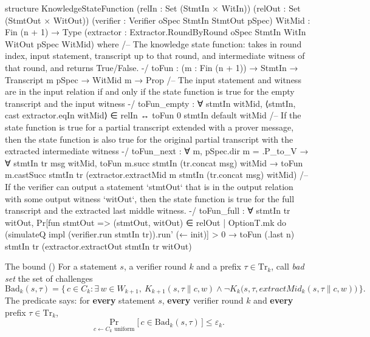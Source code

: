 \begin{leancode}
structure KnowledgeStateFunction
    (relIn : Set (StmtIn × WitIn)) (relOut : Set (StmtOut × WitOut))
    (verifier : Verifier oSpec StmtIn StmtOut pSpec)
    {WitMid : Fin (n + 1) → Type}
    (extractor : Extractor.RoundByRound oSpec StmtIn WitIn WitOut pSpec WitMid)
    where
  /-- The knowledge state function: takes in round index, input statement, transcript up to that
      round, and intermediate witness of that round, and returns True/False. -/
  toFun : (m : Fin (n + 1)) → StmtIn → Transcript m pSpec → WitMid m → Prop
  /-- The input statement and witness are in the input relation if and only if the state function is
      true for the empty transcript and the input witness -/
  toFun_empty : ∀ stmtIn witMid,
    ⟨stmtIn, cast extractor.eqIn witMid⟩ ∈ relIn ↔ toFun 0 stmtIn default witMid
  /-- If the state function is true for a partial transcript extended with a prover message, then
    the state function is also true for the original partial transcript with the extracted
    intermediate witness -/
  toFun_next : ∀ m, pSpec.dir m = .P_to_V →
    ∀ stmtIn tr msg witMid, toFun m.succ stmtIn (tr.concat msg) witMid →
      toFun m.castSucc stmtIn tr (extractor.extractMid m stmtIn (tr.concat msg) witMid)
  /-- If the verifier can output a statement `stmtOut` that is in the output relation with some
    output witness `witOut`, then the state function is true for the full transcript and the
    extracted last middle witness. -/
  toFun_full : ∀ stmtIn tr witOut,
    Pr[fun stmtOut => (stmtOut, witOut) ∈ relOut
    | OptionT.mk do (simulateQ impl (verifier.run stmtIn tr)).run' (← init)] > 0 →
    toFun (.last n) stmtIn tr (extractor.extractOut stmtIn tr witOut)
\end{leancode}


\begin{define}{The bound (\allowbreak{})}
For a statement $s$, a verifier round $k$ and a prefix $\tau \in \mathrm{Tr}_k$, call \emph{bad
set} the set of challenges
\[
  \mathrm{Bad}_k(s, \tau) = \bigl\{\, c \in C_k : \exists\, w \in W_{k+1},\
  K_{k+1}(s, \tau\|c, w) \wedge \neg K_k\bigl(s, \tau, \mathit{extractMid}_k(s, \tau\|c, w)\bigr) \,\bigr\}.
\]
The predicate says: for \textbf{every} statement $s$, \textbf{every} verifier round $k$ and
\textbf{every} prefix $\tau \in \mathrm{Tr}_k$,
\[
  \Pr_{c \leftarrow C_k \text{ uniform}}\bigl[\, c \in \mathrm{Bad}_k(s, \tau) \,\bigr] \le \varepsilon_k .
\]
\end{define}

